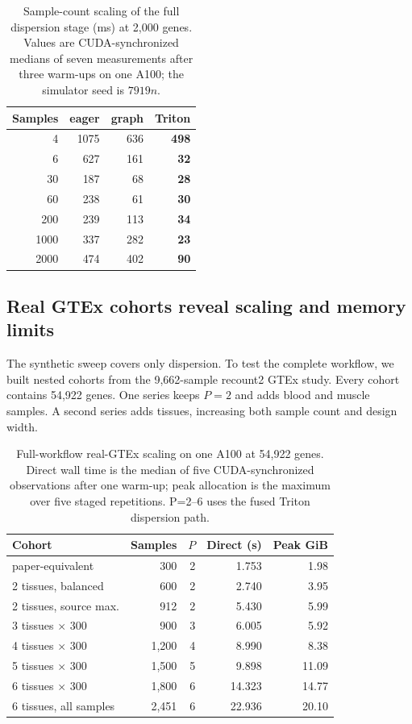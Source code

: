 \documentclass[12pt]{article}
\begin{document}
\begin{table}[htbp]\centering
\caption{Sample-count scaling of the full dispersion stage (ms) at 2{,}000
genes. Values are CUDA-synchronized medians of seven measurements after three
warm-ups on one A100; the simulator seed is $7919n$.}
\label{tab:samplescaling}
\begin{tabular}{rrrr}
\toprule
Samples & eager & graph & Triton \\\midrule
4    & 1075 & 636 & \textbf{498} \\
6    & 627  & 161 & \textbf{32}  \\
30   & 187  & 68  & \textbf{28}  \\
60   & 238  & 61  & \textbf{30}  \\
200  & 239  & 113 & \textbf{34}  \\
1000 & 337  & 282 & \textbf{23}  \\
2000 & 474  & 402 & \textbf{90}  \\\bottomrule
\end{tabular}
\end{table}

\subsection{Real GTEx cohorts reveal scaling and memory limits}
The synthetic sweep covers only dispersion. To test the complete workflow, we
built nested cohorts from the 9{,}662-sample recount2 GTEx study. Every cohort
contains 54{,}922 genes. One series keeps $P=2$ and adds blood and muscle
samples. A second series adds tissues, increasing both sample count and design
width.

\begin{table}[htbp]\centering
\caption{Full-workflow real-GTEx scaling on one A100 at 54{,}922 genes. Direct
wall time is the median of five CUDA-synchronized observations after one
warm-up; peak allocation is the maximum over five staged repetitions. P=2--6
uses the fused Triton dispersion path.}
\label{tab:gtexscale}
{\footnotesize
\begin{tabular}{lrrrr}
\toprule
Cohort & Samples & $P$ & Direct (s) & Peak GiB \\\midrule
paper-equivalent       & 300   & 2 & 1.753  & 1.98 \\
2 tissues, balanced    & 600   & 2 & 2.740  & 3.95 \\
2 tissues, source max. & 912   & 2 & 5.430  & 5.99 \\
3 tissues $\times$ 300 & 900   & 3 & 6.005  & 5.92 \\
4 tissues $\times$ 300 & 1{,}200 & 4 & 8.990  & 8.38 \\
5 tissues $\times$ 300 & 1{,}500 & 5 & 9.898  & 11.09 \\
6 tissues $\times$ 300 & 1{,}800 & 6 & 14.323 & 14.77 \\
6 tissues, all samples & 2{,}451 & 6 & 22.936 & 20.10 \\\bottomrule
\end{tabular}}
\end{table}
\end{document}
